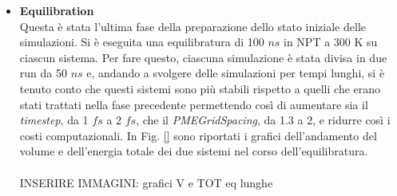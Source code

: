 \begin{itemize}
\item \textbf{Equilibration}\\
Questa è stata l'ultima fase della preparazione dello stato iniziale delle simulazioni. Si è eseguita una equilibratura di 100 $ns$ in NPT a 300 K su ciascun sistema. Per fare questo, ciascuna simulazione è stata divisa in due run da 50 $ns$ e, andando a svolgere delle simulazioni per tempi lunghi, si è tenuto conto che questi sistemi sono più stabili rispetto a quelli che erano stati trattati nella fase precedente permettendo così di aumentare sia il \textit{timestep}, da 1 $fs$ a 2 $fs$, che il \textit{PMEGridSpacing}, da 1.3 a 2, e ridurre così i costi computazionali. In Fig. \ref{} sono riportati i grafici dell'andamento del volume e dell'energia totale dei due sistemi nel corso dell'equilibratura.\\ 
\\
INSERIRE IMMAGINI: grafici V e TOT eq lunghe\\
\end{itemize} 


